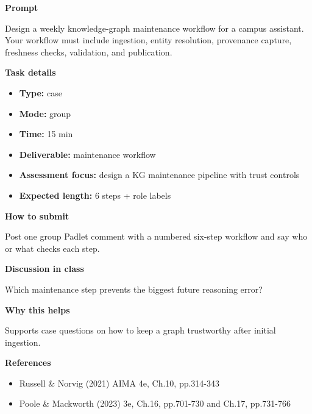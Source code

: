 \documentclass[11pt]{article}
\begin{document}
\begin{tcolorbox}[colback=white,colframe=MidnightBlue,title={Q5 Collaborative Mini-Case},fonttitle=\bfseries,breakable]
\begin{center}
\end{center}

{\large\bfseries\color{MidnightBlue} Prompt}\par\medskip
Design a weekly knowledge-graph maintenance workflow for a campus assistant. Your workflow must include ingestion, entity resolution, provenance capture, freshness checks, validation, and publication.

{\large\bfseries\color{MidnightBlue} Task details}\par\medskip
\begin{itemize}\item \textbf{Type:} case
\item \textbf{Mode:} group
\item \textbf{Time:} 15 min
\item \textbf{Deliverable:} maintenance workflow
\item \textbf{Assessment focus:} design a KG maintenance pipeline with trust controls
\item \textbf{Expected length:} 6 steps + role labels\end{itemize}

{\large\bfseries\color{MidnightBlue} How to submit}\par\medskip
Post one group Padlet comment with a numbered six-step workflow and say who or what checks each step.

{\large\bfseries\color{MidnightBlue} Discussion in class}\par\medskip
Which maintenance step prevents the biggest future reasoning error?

{\large\bfseries\color{MidnightBlue} Why this helps}\par\medskip
Supports case questions on how to keep a graph trustworthy after initial ingestion.

{\large\bfseries\color{MidnightBlue} References}\par\medskip
\begin{itemize}\item Russell \& Norvig (2021) AIMA 4e, Ch.10, pp.314-343
\item Poole \& Mackworth (2023) 3e, Ch.16, pp.701-730 and Ch.17, pp.731-766\end{itemize}
\end{tcolorbox}
\end{document}
